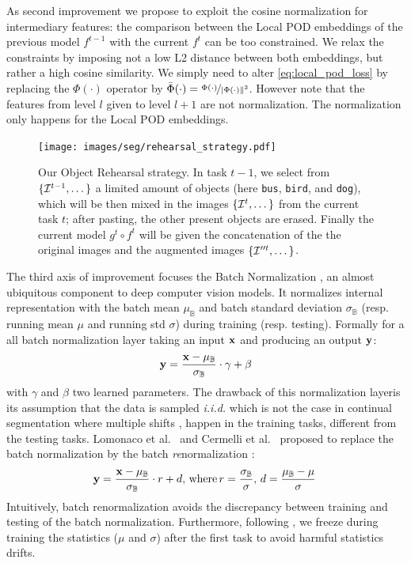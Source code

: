 As second improvement we propose to exploit the cosine normalization for intermediary features: the
comparison between the Local POD embeddings of the previous model $f^{t-1}$ with the current $f^t$
can be too constrained. We relax the constraints by imposing not a low L2 distance between both
embeddings, but rather a high cosine similarity. We simply need to alter \autoref{eq:local_pod_loss}
by replacing the $\Phi(\cdot)$ operator by $\bar{\Phi}(\cdot) =
    \nicefrac{\Phi(\cdot)}{\vert\Phi(\cdot)\Vert^2}$. However note that the features from level $l$
given to level $l+1$ are not normalization. The normalization only happens for the Local POD
embeddings.

\begin{figure}[ht!]
    \centering
    \texttt{[image: images/seg/rehearsal\_strategy.pdf]}
    \caption{Our Object Rehearsal strategy. In task $t-1$, we select from $\{\mathcal{I}^{t-1}, \dots \}$ a
        limited amount of objects (here \texttt{bus}, \texttt{bird}, and \texttt{dog}), which will be
        then mixed in the images $\{\mathcal{I}^{t}, \dots \}$ from the current task $t$; after pasting, the
        other present objects are erased. Finally the current model $g^t \circ f^t$ will be given the
        concatenation of the the original images and the augmented images $\{\mathcal{I}''^t, \dots\}$.}
    \label{fig:model_objectrehearsal}
\end{figure}

The third axis of improvement focuses the Batch Normalization \citep{ioffe2015batchnorm}, an almost
ubiquitous component to deep computer vision models. It normalizes internal representation with the
batch mean $\mu_\mathbb{B}$ and batch standard deviation $\sigma_\mathbb{B}$ (resp. running mean
$\mu$ and running std $\sigma$) during training (resp. testing). Formally for a all batch
normalization layer taking an input $\mathbf{x}$ and producing an output $\mathbf{y}$:
%
\begin{equation}
    \mathbf{y} = \frac{\mathbf{x} - \mu_\mathbb{B}}{\sigma_\mathbb{B}} \cdot \gamma + \beta
    \label{eq:batch_norm}
\end{equation}
%
with $\gamma$ and $\beta$ two learned parameters. The drawback of this normalization layeris its
assumption that the data is sampled \textit{i.i.d.} which is not the case in continual segmentation
where multiple shifts
\citep{morenotorresa2012datasetshift,lesort2021driftanalysis,douillardlesort2021continuum}, happen in
the training tasks, different from the testing tasks. Lomonaco et al.~\citep{lomonaco2020ar1} and
Cermelli et al.~\citep{cermelli2020fewshotcontinualsegm} proposed to replace the batch normalization
by the batch \textit{re}normalization \citep{ioffe2017batchrenorm}:
%
\begin{equation}
    \mathbf{y} = \frac{\mathbf{x} - \mu_\mathbb{B}}{\sigma_\mathbb{B}} \cdot r + d,\,\text{where}\, r = \frac{\sigma_\mathbb{B}}{\sigma},\, d = \frac{\mu_\mathbb{B} - \mu}{\sigma}\,
    \label{eq:batch_renorm}
\end{equation}
%
Intuitively, batch renormalization avoids the discrepancy between training and testing of the batch
normalization. Furthermore, following \citep{cermelli2020fewshotcontinualsegm}, we freeze during
training the statistics ($\mu$ and $\sigma$) after the first task to avoid harmful statistics
drifts.

